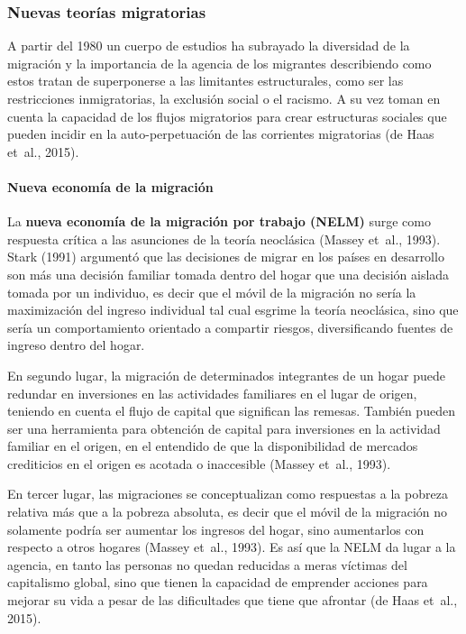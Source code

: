 \documentclass[12pt,spanish,]{article}
\let\oldparagraph\paragraph
\renewcommand{\paragraph}[1]{\oldparagraph{#1}\mbox{}}
\begin{document}
\hypertarget{nuevas-teoruxedas-migratorias}{%
\subsubsection{Nuevas teorías
migratorias}\label{nuevas-teoruxedas-migratorias}}

A partir del 1980 un cuerpo de estudios ha subrayado la diversidad de la
migración y la importancia de la agencia de los migrantes describiendo
como estos tratan de superponerse a las limitantes estructurales, como
ser las restricciones inmigratorias, la exclusión social o el racismo. A
su vez toman en cuenta la capacidad de los flujos migratorios para crear
estructuras sociales que pueden incidir en la auto-perpetuación de las
corrientes migratorias (de Haas et~al., 2015).

\hypertarget{nueva-economuxeda-de-la-migraciuxf3n}{%
\paragraph{Nueva economía de la
migración}\label{nueva-economuxeda-de-la-migraciuxf3n}}

La \textbf{nueva economía de la migración por trabajo (NELM)} surge como
respuesta crítica a las asunciones de la teoría neoclásica (Massey
et~al., 1993). Stark (1991) argumentó que las decisiones de migrar en
los países en desarrollo son más una decisión familiar tomada dentro del
hogar que una decisión aislada tomada por un individuo, es decir que el
móvil de la migración no sería la maximización del ingreso individual
tal cual esgrime la teoría neoclásica, sino que sería un comportamiento
orientado a compartir riesgos, diversificando fuentes de ingreso dentro
del hogar.

En segundo lugar, la migración de determinados integrantes de un hogar
puede redundar en inversiones en las actividades familiares en el lugar
de origen, teniendo en cuenta el flujo de capital que significan las
remesas. También pueden ser una herramienta para obtención de capital
para inversiones en la actividad familiar en el origen, en el entendido
de que la disponibilidad de mercados crediticios en el origen es acotada
o inaccesible (Massey et~al., 1993).

En tercer lugar, las migraciones se conceptualizan como respuestas a la
pobreza relativa más que a la pobreza absoluta, es decir que el móvil de
la migración no solamente podría ser aumentar los ingresos del hogar,
sino aumentarlos con respecto a otros hogares (Massey et~al., 1993). Es
así que la NELM da lugar a la agencia, en tanto las personas no quedan
reducidas a meras víctimas del capitalismo global, sino que tienen la
capacidad de emprender acciones para mejorar su vida a pesar de las
dificultades que tiene que afrontar (de Haas et~al., 2015).
\end{document}
